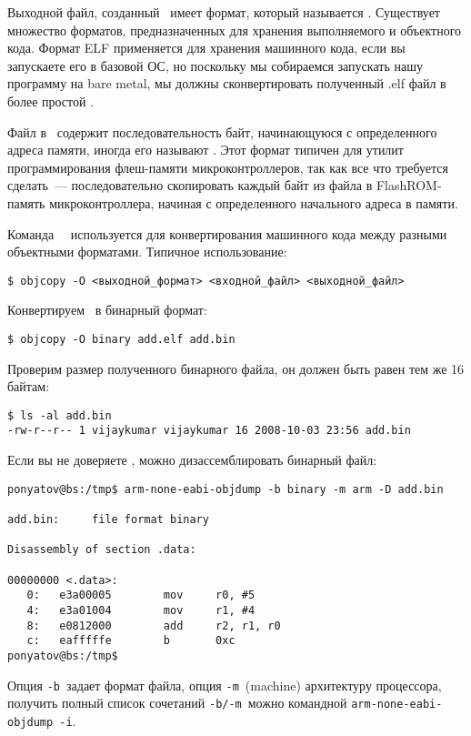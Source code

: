\bigskip
Выходной файл, созданный \ имеет формат, который называется
. Существует множество форматов, предназначенных для хранения
выполняемого и объектного кода. Формат ELF применяется для хранения
машинного кода, если вы запускаете его в базовой ОС, но поскольку мы собираемся запускать нашу
программу на bare metal, мы должны сконвертировать полученный
.elf файл в более простой .

Файл в \ содержит последовательность байт, начинающуюся с
определенного адреса памяти, иногда его называют . Этот
формат типичен для утилит программирования флеш-памяти микроконтроллеров, так
как все что требуется сделать\ --- последовательно скопировать каждый байт из
файла в FlashROM-память микроконтроллера, начиная с определенного начального
адреса в памяти.

Команда \gnut\ \ используется для конвертирования машинного кода
между разными объектными форматами. Типичное использование:

\begin{verbatim}
$ objcopy -O <выходной_формат> <входной_файл> <выходной_файл>
\end{verbatim}

Конвертируем \ в бинарный формат:

\begin{verbatim}
$ objcopy -O binary add.elf add.bin
\end{verbatim}

Проверим размер полученного бинарного файла, он должен быть равен тем же 16
байтам:

\begin{verbatim}
$ ls -al add.bin
-rw-r--r-- 1 vijaykumar vijaykumar 16 2008-10-03 23:56 add.bin
\end{verbatim}

Если вы не доверяете , можно дизассемблировать бинарный файл:

\begin{verbatim}
ponyatov@bs:/tmp$ arm-none-eabi-objdump -b binary -m arm -D add.bin

add.bin:     file format binary

Disassembly of section .data:

00000000 <.data>:
   0:   e3a00005        mov     r0, #5
   4:   e3a01004        mov     r1, #4
   8:   e0812000        add     r2, r1, r0
   c:   eafffffe        b       0xc
ponyatov@bs:/tmp$ 
\end{verbatim}
Опция \verb|-b|\ задает формат файла, опция \verb|-m|\ (machine) архитектуру
процессора, получить полный список сочетаний \verb|-b/-m|\ можно командной
\verb|arm-none-eabi-objdump -i|.

